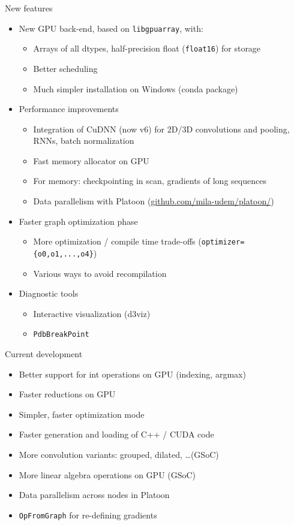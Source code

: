 \documentclass[a4paper,9pt]{beamer}
\begin{document}
\begin{frame}[fragile]{New features}
  \begin{itemize}
    \item New GPU back-end, based on \verb|libgpuarray|, with:
      \begin{itemize}
        \item Arrays of all dtypes, half-precision float (\verb|float16|) for storage
        \item Better scheduling
        \item Much simpler installation on Windows (conda package)
      \end{itemize}
    \item Performance improvements
      \begin{itemize}
        \item Integration of CuDNN (now v6) for 2D/3D convolutions and pooling, RNNs, batch normalization
        \item Fast memory allocator on GPU
        \item For memory: checkpointing in scan, gradients of long sequences
        \item Data parallelism with Platoon (\url{github.com/mila-udem/platoon/})
      \end{itemize}
    \item Faster graph optimization phase
      \begin{itemize}
        \item More optimization / compile time trade-offs (\verb|optimizer={o0,o1,...,o4}|)
        \item Various ways to avoid recompilation
      \end{itemize}
    \item Diagnostic tools
      \begin{itemize}
        \item Interactive visualization (d3viz)
        \item \verb|PdbBreakPoint|
      \end{itemize}
  \end{itemize}
\end{frame}

\begin{frame}[fragile]{Current development}
  \begin{itemize}
    \item Better support for int operations on GPU (indexing, argmax)
    \item Faster reductions on GPU
    \item Simpler, faster optimization mode
    \item Faster generation and loading of C++ / CUDA code
    \item More convolution variants: grouped, dilated, \ldots (GSoC)
    \item More linear algebra operations on GPU (GSoC)
    \item Data parallelism across nodes in Platoon
    \item \verb|OpFromGraph| for re-defining gradients
  \end{itemize}
\end{frame}
\end{document}
